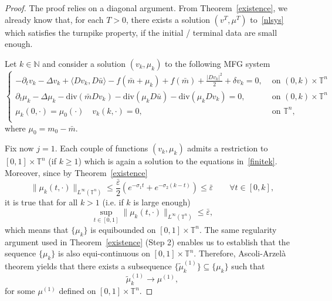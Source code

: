 \documentclass[10pt,a4paper,nouppercase,nowrite]{article}
\numberwithin{equation}{section}
\newcommand{\eps}{\varepsilon}
\newcommand{\T}{\mathbb{T}}
\theoremstyle{definition}
\begin{document}
\begin{proof} The proof relies on a diagonal argument.
	From Theorem~\ref{existence}, we already know that, for each $T > 0$, there exists a solution $(v^T,\mu^T)$ to~\eqref{nlsys} which satisfies the turnpike property, if the initial / terminal data are small enough. 
	
	Let $k \in \mathbb{N}$ and consider a solution $(v_k,\mu_k)$ to the following MFG system
	\begin{equation} \label{finitek}
		\begin{cases}
			-\partial_t v_k - \Delta v_k + \langle Dv_k,D\bar{u} \rangle - f(\bar{m}+\mu_k) + f(\bar{m}) + \frac{|Dv_k|^2}{2} + \delta v_k=0,&  \text{ on } (0,k) \times \T^n \\
			\partial_t \mu_k - \Delta \mu_k - \text{div}(\bar{m}Dv_k) - \text{div}(\mu_k D\bar{u}) - \text{div}(\mu_k Dv_k)= 0,&  \text{ on } (0,k) \times \T^n  \\
			\mu_k(0,\cdot)=\mu_0(\cdot) \quad v_k(k,\cdot)=0,& \text{ on } \T^n, \\
		\end{cases}
	\end{equation}
	where $\mu_0=m_0-\bar m$.
	
	Fix now $j=1$. Each couple of functions $(v_k,\mu_k)$ admits a restriction to $[0,1] \times \T^n$ (if $k \geq 1$) which is again a solution to the equations in~\eqref{finitek}. Moreover, since by Theorem~\ref{existence}
	$$\| \mu_k(t,\cdot) \|_{L^{\infty}(\T^n)} \le \frac{\bar \eps}{2} \left( e^{-\sigma_1 t} + e^{-\sigma_2(k-t)} \right) \le \bar \eps \qquad \forall t \in [0,k],$$
	it is true that for all $k > 1$ (i.e. if $k$ is large enough)
	$$\sup_{t \in [0,1]} \| \mu_k(t,\cdot) \|_{L^{\infty}(\T^n)} \le \bar \eps,$$
	which means that $\{ \mu_k \}$ is equibounded on $[0,1] \times \T^n$. The same regularity argument used in Theorem~\ref{existence} (Step 2) enables us to establish that the sequence $\{ \mu_k \}$ is also equi-continuous on $[0,1] \times \T^n$. Therefore, Ascoli-Arzelà theorem yields that there exists a subsequence $\{ \tilde \mu_k^{(1)} \} \subseteq \{ \mu_k \}$ such that
	$$\tilde \mu_k^{(1)} \to \mu^{(1)},$$
	for some $\mu^{(1)}$ defined on $[0,1] \times \T^n$.
	

\end{proof}
\end{document}
